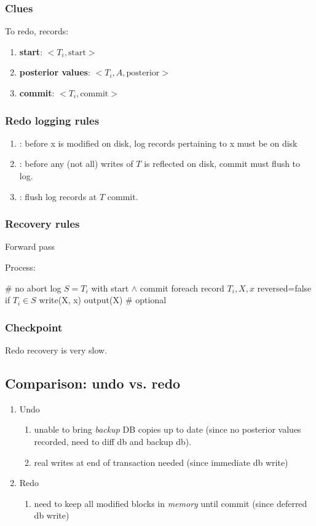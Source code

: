 \documentclass[a4paper]{report}
\begin{document}
\subsubsection{Clues}
To redo, records: 
\begin{enumerate}
\item \textbf{start}: $<T_i, \text{start}>$
\item \textbf{posterior values}: $<T_i, A, \text{posterior}>$
\item \textbf{commit}: $<T_i, \text{commit}>$
\end{enumerate}

\subsubsection{Redo logging rules}
\begin{enumerate}
\item {}: before x is modified on disk, log records pertaining to x must be on disk
\item {}: before any (not all) writes of $T$ is reflected on disk, commit must flush to log.
\item {}: flush log records at $T$ commit. 
\end{enumerate}

\subsubsection{Recovery rules}
Forward pass

Process: 
\begin{pseudo}
# no abort log
$S = T_i$ with start $\wedge$ commit
foreach record $T_i, X, x$ reversed=false
  if $T_i \in S$
    write(X, x)
    output(X) # optional
\end{pseudo}

\subsubsection{Checkpoint}
Redo recovery is very slow. 

\subsection*{Comparison: undo vs. redo }
\begin{enumerate}
\item Undo
\begin{enumerate}
\item unable to bring \textit{backup} DB copies up to date (since no posterior values recorded, need to diff db and backup db).
\item real writes at end of transaction needed (since immediate db write)
\end{enumerate}
\item Redo
\begin{enumerate}
\item need to keep all modified blocks in \textit{memory} until commit (since deferred db write)
\end{enumerate}
\end{enumerate}
\end{document}

